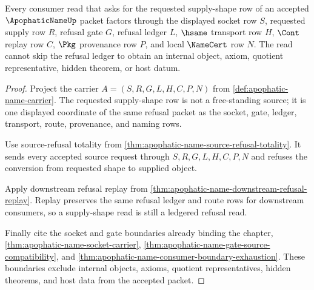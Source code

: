 \begin{theorem}
\label{thm:apophatic-name-supply-request-consumer-factorization}
Every consumer read that asks for the requested supply-shape row of an accepted $\ApophaticNameUp$ packet factors through the displayed socket row $S$, requested supply row $R$, refusal gate $G$, refusal ledger $L$, $\hsame$ transport row $H$, $\Cont$ replay row $C$, $\Pkg$ provenance row $P$, and local $\NameCert$ row $N$. The read cannot skip the refusal ledger to obtain an internal object, axiom, quotient representative, hidden theorem, or host datum.
\end{theorem}
\begin{proof}
Project the carrier $A=(S,R,G,L,H,C,P,N)$ from \autoref{def:apophatic-name-carrier}. The requested supply-shape row is not a free-standing source; it is one displayed coordinate of the same refusal packet as the socket, gate, ledger, transport, route, provenance, and naming rows.

Use source-refusal totality from \autoref{thm:apophatic-name-source-refusal-totality}. It sends every accepted source request through $S,R,G,L,H,C,P,N$ and refuses the conversion from requested shape to supplied object.

Apply downstream refusal replay from \autoref{thm:apophatic-name-downstream-refusal-replay}. Replay preserves the same refusal ledger and route rows for downstream consumers, so a supply-shape read is still a ledgered refusal read.

Finally cite the socket and gate boundaries already binding the chapter, \autoref{thm:apophatic-name-socket-carrier}, \autoref{thm:apophatic-name-gate-source-compatibility}, and \autoref{thm:apophatic-name-consumer-boundary-exhaustion}. These boundaries exclude internal objects, axioms, quotient representatives, hidden theorems, and host data from the accepted packet.
\end{proof}

